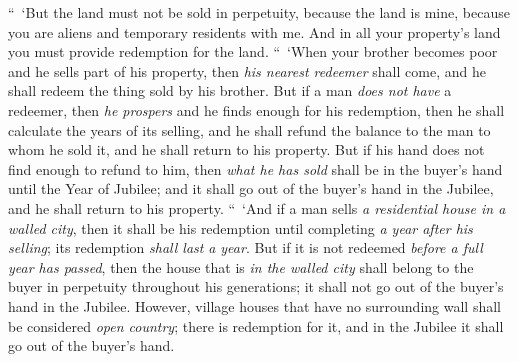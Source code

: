 \begin{biblechapter}
\verse “ ‘But the land must not be sold in perpetuity, because the land is mine, because you are aliens and temporary residents with me.
\verse And in all your property’s land you must provide redemption for the land.
\verse “ ‘When your brother becomes poor and he sells part of his property, then \textit{his nearest redeemer} shall come, and he shall redeem the thing sold by his brother.
\verse But if a man \textit{does not have} a redeemer, then \textit{he prospers} and he finds enough for his redemption,
\verse then he shall calculate the years of its selling, and he shall refund the balance to the man to whom he sold it, and he shall return to his property.
\verse But if his hand does not find enough to refund to him, then \textit{what he has sold} shall be in the buyer’s hand until the Year of Jubilee; and it shall go out of the buyer’s hand in the Jubilee, and he shall return to his property.
\verse “ ‘And if a man sells \textit{a residential house in a walled city}, then it shall be his redemption until completing \textit{a year after his selling}; its redemption \textit{shall last} \textit{a year}.
\verse But if it is not redeemed \textit{before a full year has passed}, then the house that is \textit{in the walled city} shall belong to the buyer in perpetuity throughout his generations; it shall not go out of the buyer’s hand in the Jubilee.
\verse However, village houses that have no surrounding wall shall be considered \textit{open country}; there is redemption for it, and in the Jubilee it shall go out of the buyer’s hand.

\end{biblechapter}
